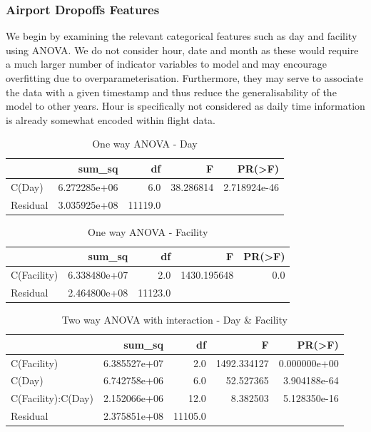 \documentclass[11pt]{article}
\begin{document}
\subsubsection{Airport Dropoffs Features}
We begin by examining the relevant categorical features such as day and facility using ANOVA. We do not consider hour, date and month as these would require a much larger number of indicator variables to model and may encourage overfitting due to overparameterisation. Furthermore, they may serve to associate the data with a given timestamp and thus reduce the generalisability of the model to other years. Hour is specifically not considered as daily time information is already somewhat encoded within flight data.

\begin{table}[h!]
\centering
\caption{One way ANOVA - Day}
\label{tbl:anova_day}
\begin{tabular}{lrrrr}
\toprule
{} &        sum\_sq &       df &          F &        PR(>F) \\
\midrule
C(Day)   &  6.272285e+06 &      6.0 &  38.286814 &  2.718924e-46 \\
Residual &  3.035925e+08 &  11119.0 &         &            \\
\bottomrule
\end{tabular}
\end{table}

\begin{table}[H]
\centering
\caption{One way ANOVA - Facility}
\label{tbl:anova_facility}
\begin{tabular}{lrrrr}
\toprule
{} &        sum\_sq &       df &            F &  PR(>F) \\
\midrule
C(Facility) &  6.338480e+07 &      2.0 &  1430.195648 &     0.0 \\
Residual    &  2.464800e+08 &  11123.0 &           &      \\
\bottomrule
\end{tabular}
\end{table}

\begin{table}[H]
\centering
\caption{Two way ANOVA with interaction - Day \& Facility}
\label{tbl:anova_interaction}
\begin{tabular}{lrrrr}
\toprule
{} &        sum\_sq &       df &            F &        PR(>F) \\
\midrule
C(Facility)        &  6.385527e+07 &      2.0 &  1492.334127 &  0.000000e+00 \\
C(Day)             &  6.742758e+06 &      6.0 &    52.527365 &  3.904188e-64 \\
C(Facility):C(Day) &  2.152066e+06 &     12.0 &     8.382503 &  5.128350e-16 \\
Residual           &  2.375851e+08 &  11105.0 &           &            \\
\bottomrule
\end{tabular}
\end{table}
\end{document}
